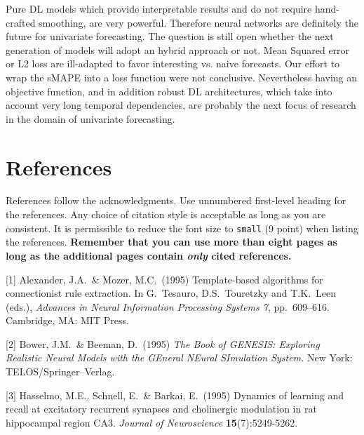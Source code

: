 \documentclass{article}
\begin{document}
Pure DL models which provide interpretable results and do not require hand-crafted smoothing, are very powerful. Therefore neural networks are definitely the future for univariate forecasting. 
The question is still open whether the next generation of models will adopt an hybrid approach or not. Mean Squared error or L2 loss are ill-adapted to favor interesting  vs. naive forecasts.
Our effort to wrap the sMAPE into a loss function were not conclusive. Nevertheless having an objective function, and in addition robust DL architectures, which take into account very long temporal dependencies,
are probably the next focus of research in the domain of univariate forecasting.

\section*{References}

References follow the acknowledgments. Use unnumbered first-level heading for
the references. Any choice of citation style is acceptable as long as you are
consistent. It is permissible to reduce the font size to \verb+small+ (9 point)
when listing the references. {\bf Remember that you can use more than eight
  pages as long as the additional pages contain \emph{only} cited references.}
\medskip

\small

[1] Alexander, J.A.\ \& Mozer, M.C.\ (1995) Template-based algorithms for
connectionist rule extraction. In G.\ Tesauro, D.S.\ Touretzky and T.K.\ Leen
(eds.), {\it Advances in Neural Information Processing Systems 7},
pp.\ 609--616. Cambridge, MA: MIT Press.

[2] Bower, J.M.\ \& Beeman, D.\ (1995) {\it The Book of GENESIS: Exploring
  Realistic Neural Models with the GEneral NEural SImulation System.}  New York:
TELOS/Springer--Verlag.

[3] Hasselmo, M.E., Schnell, E.\ \& Barkai, E.\ (1995) Dynamics of learning and
recall at excitatory recurrent synapses and cholinergic modulation in rat
hippocampal region CA3. {\it Journal of Neuroscience} {\bf 15}(7):5249-5262.
\end{document}
